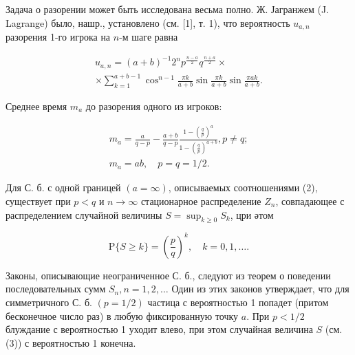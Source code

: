 \documentclass[10pt]{article}
\begin{document}
Задача о разорении может быть исследована весьма полно. Ж. Јагранжем (J. Lagrange) было, нашр., установлено (см. [1], т. 1), что вероятность $u_{a, n}$ разорения 1-го игрока на $n$-м шаге равна



\[

\begin{gathered}

u_{a, n}=(a+b)^{-1} 2^{n} p^{\frac{n-a}{2}} q^{\frac{n+a}{2}} \times \\

\times \sum_{k=1}^{a+b-1} \cos ^{n-1} \frac{\pi k}{a+b} \sin \frac{\pi k}{a+b} \sin \frac{\pi a k}{a+b} .

\end{gathered}

\]



Среднее время $m_{a}$ до разорения одного из игроков:



\[

\begin{gathered}

m_{a}=\frac{a}{q-p}-\frac{a+b}{q-p} \frac{1-\left(\frac{q}{p}\right)^{a}}{1-\left(\frac{q}{p}\right)^{a+b}}, p \neq q ; \\

m_{a}=a b, \quad p=q=1 / 2 .

\end{gathered}

\]



Для С. б. с одной границей $(a=\infty)$, описываемых соотношениями (2), существует при $p<q$ и $n \rightarrow \infty$ стационарное распределение $Z_{n}$, совпадающее с распределением случайной величины $S=\sup _{k \geqslant 0} S_{k}$, цри әтом



\[

\mathrm{P}\{S \geqslant k\}=\left(\frac{p}{q}\right)^{k}, \quad k=0,1, \ldots .

\]



Законы, описывающие неограниченное С. б., следуют из теорем о поведении последовательных сумм $S_{n}, n=1,2, \ldots$ Один из этих законов утверждает, что для симметричного С. б. $(p=1 / 2)$ частица с вероятностью 1 попадет (притом бесконечное число раз) в любую фиксированную точку $a$. При $p<1 / 2$ блуждание с вероятностью 1 уходит влево, при этом случайная величина $S$ (см. (3)) с вероятностью 1 конечна.
\end{document}
